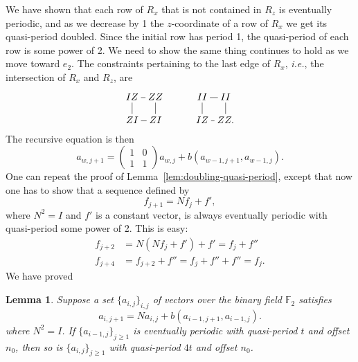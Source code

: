 \documentclass[letterpaper,10pt,pra,aps,showpacs,twocolumn]{revtex4-1}
\newtheorem{lem}{Lemma}
\theoremstyle{definition} \newtheorem{defn}{Definition}
\theoremstyle{definition} \newtheorem{remark}{Remark}
\newcommand{\ie}{\emph{i.e.}}
\begin{document}
We have shown that each row of $R_x$ that is not contained in $R_z$ is eventually periodic, and as we decrease by 1 the $z$-coordinate of a row of $R_x$ we get its quasi-period doubled. Since the initial row has period 1, the quasi-period of each row is some power of 2. We need to show the same thing continues to hold as we move toward $e_2$. The constraints pertaining to the last edge of $R_x$, \ie, the intersection of $R_x$ and $R_z$, are
\[
 \xymatrix@!0{
 IZ \ar@{-}[d] \ar@{-}[r]& ZZ & & II\ar@{-}[d] \ar@{-}[r] & II \\
 ZI & ZI\ar@{-}[u] \ar@{-}[l]  & & IZ & ZZ . \ar@{-}[u] \ar@{-}[l] 
}
\]
The recursive equation is then
 \begin{equation}
 a_{w,j+1} = \begin{pmatrix} 1 & 0 \\ 1 & 1 \end{pmatrix} a_{w,j} + b( a_{w-1,j+1} , a_{w-1,j} ).
\label{eq:code-2-Rx-Rz-recursive}
\end{equation}
One can repeat the proof of Lemma~\ref{lem:doubling-quasi-period}, except that now one has to show that a sequence defined by
\[
 f_{j+1} = N f_j + f' ,
\]
where $N^2 = I$ and $f'$ is a constant vector, is always eventually periodic with quasi-period some power of 2. This is easy:
\begin{align*}
 f_{j+2} 
&= N ( N f_j + f' ) + f' = f_j + f'' \\
 f_{j+4}
&= f_{j+2} + f'' = f_j + f'' + f'' = f_j.
\end{align*}
%
\noindent
We have proved
%
\begin{lem}
Suppose a set $\{ a_{i,j} \}_{i,j}$ of vectors over the binary field $\mathbb{F}_2$ satisfies
\[
  a_{i,j+1} = N a_{i,j} + b( a_{i-1,j+1} , a_{i-1,j} ).
\]
where $N^2 = I$. If $\{ a_{i-1,j} \}_{j \geq 1}$ is eventually periodic with quasi-period $t$ and offset $n_0$, then so is $\{ a_{i,j} \}_{j \geq 1}$ with quasi-period $4t$ and offset $n_0$.
\label{lem:double-doubled-quasi-period}
\end{lem}
\end{document}
